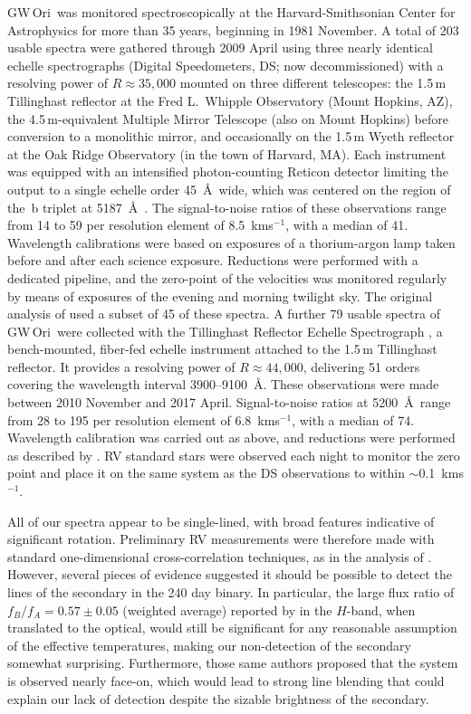 \documentclass[twocolumn]{aastex61}
\newcommand\kms{\ifmmode{\rm km\thinspace s^{-1}}\else km\thinspace s$^{-1}$\fi}
\newcommand{\obj}{GW\,Ori}
\begin{document}
\obj\ was monitored spectroscopically at the Harvard-Smithsonian Center for Astrophysics for more than 35 years, beginning in 1981 November. A total of 203 usable spectra were gathered through 2009 April using three nearly identical echelle spectrographs (Digital Speedometers, DS; now decommissioned) with a resolving power of $R \approx 35,000$ mounted on three different telescopes: the 1.5\,m Tillinghast reflector at the Fred L.\ Whipple Observatory (Mount Hopkins, AZ), the 4.5\,m-equivalent Multiple Mirror Telescope (also on Mount Hopkins) before conversion to a monolithic mirror, and occasionally on the 1.5\,m Wyeth reflector at the Oak Ridge Observatory (in the town of Harvard, MA).  Each instrument was equipped with an intensified photon-counting Reticon detector limiting the output to a single echelle order 45~\AA\ wide, which was centered on the region of the \,b triplet at 5187~\AA\ \citep[see][]{latham92}. The signal-to-noise ratios of these observations range from 14 to 59 per resolution element of 8.5~\kms, with a median of 41. Wavelength calibrations were based on exposures of a thorium-argon lamp taken before and after each science exposure. Reductions were performed with a dedicated pipeline, and the zero-point of the velocities was monitored regularly by means of exposures of the evening and morning twilight sky. The original analysis of \cite{mathieu91} used a subset of 45 of these spectra. A further 79 usable spectra of \obj\ were collected with the Tillinghast Reflector Echelle Spectrograph \citep[TRES;][]{furesz08}, a bench-mounted, fiber-fed echelle instrument attached to the 1.5\,m Tillinghast reflector. It provides a resolving power of $R \approx 44,000$, delivering 51 orders covering the wavelength interval 3900--9100~\AA. These observations were made between 2010 November and 2017 April.  Signal-to-noise ratios at 5200~\AA\ range from 28 to 195 per resolution element of 6.8~\kms, with a median of 74. Wavelength calibration was carried out as above, and reductions were performed as described by \cite{buchhave10}. RV standard stars were observed each night to monitor the zero point and place it on the same system as the DS observations to within $\sim$0.1~\kms.

All of our spectra appear to be single-lined, with broad features indicative of significant rotation. Preliminary RV measurements were therefore made with standard one-dimensional cross-correlation techniques, as in the analysis of \cite{mathieu91}. However, several pieces of evidence suggested it should be possible to detect the lines of the secondary in the 240 day binary. In particular, the large flux ratio of $f_B/f_A = 0.57 \pm 0.05$ (weighted average) reported by \cite{berger11} in the $H$-band, when translated to the optical, would still be significant for any reasonable assumption of the effective temperatures, making our non-detection of the secondary somewhat surprising. Furthermore, those same authors proposed that the system is observed nearly face-on, which would lead to strong line blending that could explain our lack of detection despite the sizable brightness of the secondary. 
\end{document}
